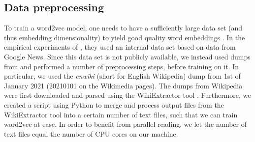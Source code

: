 \subsection{Data preprocessing}
\label{sec:word2vec-data-preprocessing}
To train a word2vec model, one needs to have a sufficiently large data set (and thus embedding dimensionality) to yield good quality word embeddings \cite{mikolov2013b}. In the empirical experiments of \cite{mikolov2013b}, they used an internal data set based on data from Google News. Since this data set is not publicly available, we instead used dumps from \cite{WikimediaDumps} and performed a number of preprocessing steps, before training on it. In particular, we used the \textit{enwiki} (short for English Wikipedia) dump from 1st of January 2021 (20210101 on the Wikimedia pages). The dumps from Wikipedia were first downloaded and parsed using the WikiExtractor tool \cite{Wikiextractor2015}. Furthermore, we created a script using Python to merge and process output files from the WikiExtractor tool into a certain number of text files, such that we can train word2vec at ease. In order to benefit from parallel reading, we let the number of text files equal the number of CPU cores on our machine.

